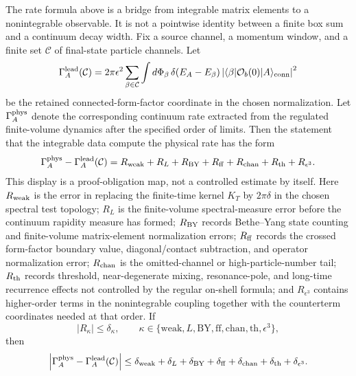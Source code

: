 \begin{remark}
\label{rem:nonintegrable-decay-rate-reconstruction-proof-obligation-map}
The rate formula above is a bridge from integrable matrix elements to a
nonintegrable observable.  It is not a pointwise identity between a finite box
sum and a continuum decay width.  Fix a source channel, a momentum window, and
a finite set \(\mathcal C\) of final-state particle channels.  Let
\[
  \Gamma_A^{\rm lead}(\mathcal C)
  =
  2\pi\epsilon^2
  \sum_{\beta\in\mathcal C}
  \int d\Phi_\beta\,
  \delta(E_A-E_\beta)
  \left|
    \langle\beta|\mathcal O_b(0)|A\rangle_{\rm conn}
  \right|^2
\]
be the retained connected-form-factor coordinate in the chosen normalization.
Let \(\Gamma_A^{\rm phys}\) denote the corresponding continuum rate extracted
from the regulated finite-volume dynamics after the specified order of limits.
Then the statement that the integrable data compute the physical rate has the
form
\begin{equation}
  \Gamma_A^{\rm phys}
  -
  \Gamma_A^{\rm lead}(\mathcal C)
  =
  R_{\rm weak}
  +R_L
  +R_{\rm BY}
  +R_{\rm ff}
  +R_{\rm chan}
  +R_{\rm th}
  +R_{\epsilon^3}.
  \label{eq:nonintegrable-decay-rate-residual-budget}
\end{equation}
This display is a proof-obligation map, not a controlled estimate by itself.
Here \(R_{\rm weak}\) is the error in replacing the finite-time kernel
\(K_T\) by \(2\pi\delta\) in the chosen spectral test topology; \(R_L\) is the
finite-volume spectral-measure error before the continuum rapidity measure has
formed; \(R_{\rm BY}\) records Bethe--Yang state counting and finite-volume
matrix-element normalization errors; \(R_{\rm ff}\) records the crossed
form-factor boundary value, diagonal/contact subtraction, and operator
normalization error; \(R_{\rm chan}\) is the omitted-channel or
high-particle-number tail; \(R_{\rm th}\) records threshold, near-degenerate
mixing, resonance-pole, and long-time recurrence effects not controlled by
the regular on-shell formula; and \(R_{\epsilon^3}\) contains higher-order
terms in the nonintegrable coupling together with the counterterm coordinates
needed at that order.  If
\[
  |R_\kappa|\le \delta_\kappa,\qquad
  \kappa\in
  \{\mathrm{weak},L,\mathrm{BY},\mathrm{ff},\mathrm{chan},
    \mathrm{th},\epsilon^3\},
\]
then
\begin{equation}
  \left|
  \Gamma_A^{\rm phys}
  -
  \Gamma_A^{\rm lead}(\mathcal C)
  \right|
  \le
  \delta_{\rm weak}+\delta_L+\delta_{\rm BY}+\delta_{\rm ff}
  +\delta_{\rm chan}+\delta_{\rm th}+\delta_{\epsilon^3}.

\end{equation}
\end{remark}
